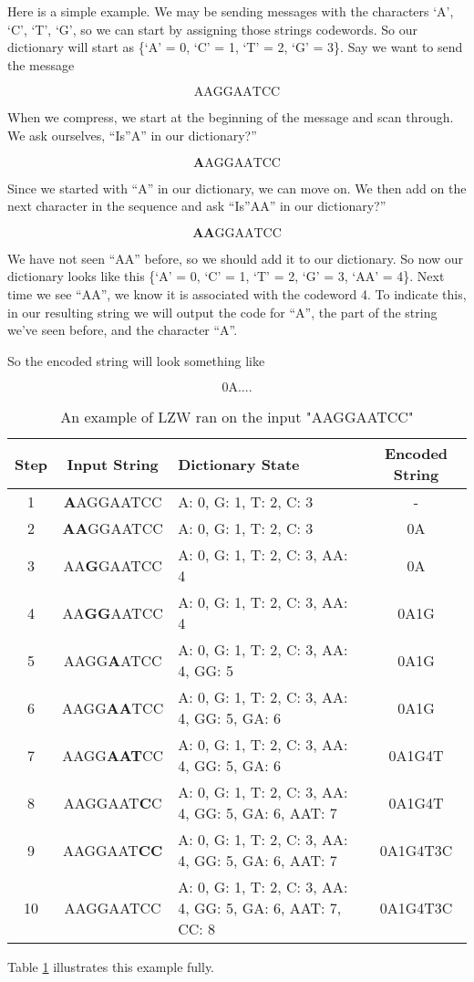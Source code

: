 \documentclass[12pt,twoside]{reedthesis}
\begin{document}
Here is a simple example. We may be sending messages with the characters `A', `C', `T', `G', so we can start by assigning those strings codewords. So our dictionary will start as \{`A' = 0, `C' = 1, `T' = 2, `G' = 3\}. Say we want to send the message

\[\text{AAGGAATCC}\]

When we compress, we start at the beginning of the message and scan through. We ask ourselves, ``Is''A'' in our dictionary?''

\[\textbf{A} \text{AGGAATCC}\]

Since we started with ``A'' in our dictionary, we can move on. We then add on the next character in the sequence and ask ``Is''AA'' in our dictionary?''

\[\textbf{AA} \text{GGAATCC}\]

We have not seen ``AA'' before, so we should add it to our dictionary. So now our dictionary looks like this \{`A' = 0, `C' = 1, `T' = 2, `G' = 3, `AA' = 4\}. Next time we see ``AA'', we know it is associated with the codeword 4. To indicate this, in our resulting string we will output the code for ``A'', the part of the string we've seen before, and the character ``A''.

So the encoded string will look something like

\[\text{0A....}\]
\begin{table}
\begin{tabular}{ | c | c | p{} | c | }
\hline
\textbf{Step} & \textbf{Input String} & \textbf{Dictionary State} & \textbf{Encoded String} \\
\hline
1 & \textbf{A}AGGAATCC & {A: 0, G: 1, T: 2, C: 3} & - \\
\hline
2 & \textbf{AA}GGAATCC & {A: 0, G: 1, T: 2, C: 3} & 0A \\
\hline
3 & AA\textbf{G}GAATCC & {A: 0, G: 1, T: 2, C: 3, AA: 4} & 0A  \\
\hline
4 & AA\textbf{GG}AATCC & {A: 0, G: 1, T: 2, C: 3, AA: 4} & 0A1G   \\
\hline
5 & AAGG\textbf{A}ATCC & {A: 0, G: 1, T: 2, C: 3, AA: 4, GG: 5} & 0A1G \\
\hline
6 & AAGG\textbf{AA}TCC & {A: 0, G: 1, T: 2, C: 3, AA: 4, GG: 5, GA: 6} & 0A1G  \\
\hline
7 & AAGG\textbf{AAT}CC & {A: 0, G: 1, T: 2, C: 3, AA: 4, GG: 5, GA: 6} & 0A1G4T  \\
\hline
8 & AAGGAAT\textbf{C}C & {A: 0, G: 1, T: 2, C: 3, AA: 4, GG: 5, GA: 6, AAT: 7} & 0A1G4T \\
\hline
9 & AAGGAAT\textbf{CC} & {A: 0, G: 1, T: 2, C: 3, AA: 4, GG: 5, GA: 6, AAT: 7} & 0A1G4T3C \\
\hline
10 & AAGGAATCC & {A: 0, G: 1, T: 2, C: 3, AA: 4, GG: 5, GA: 6, AAT: 7, CC: 8} & 0A1G4T3C \\
\hline
\end{tabular}
\label{tab:lzwexample}
\caption{ An example of LZW ran on the input "AAGGAATCC"}
\end{table}
Table \ref{tab:lzwexample} illustrates this example fully.
\end{document}
